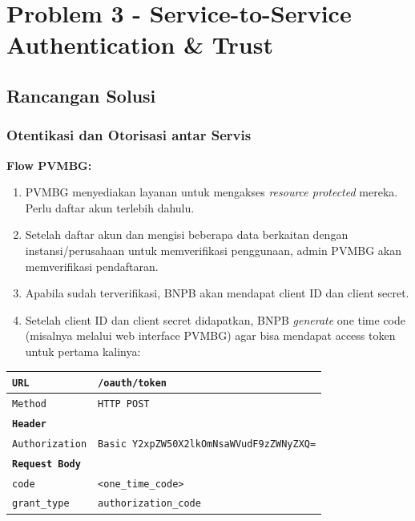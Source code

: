 \chapter{Problem 3 - Service-to-Service Authentication \& Trust}

\section{Rancangan Solusi}

\subsection{Otentikasi dan Otorisasi antar Servis}

\textbf{Flow PVMBG:}

\begin{enumerate}
\def\labelenumi{\arabic{enumi}.}
\tightlist
\item
  PVMBG menyediakan layanan untuk mengakses \emph{resource protected} mereka. Perlu daftar akun terlebih dahulu.\\
\item
  Setelah daftar akun dan mengisi beberapa data berkaitan dengan instansi/perusahaan untuk memverifikasi penggunaan, admin PVMBG akan memverifikasi pendaftaran.\\
\item
  Apabila sudah terverifikasi, BNPB akan mendapat client ID dan client secret.\\
\item
  Setelah client ID dan client secret didapatkan, BNPB \emph{generate} one time code (misalnya melalui web interface PVMBG) agar bisa mendapat access token untuk pertama kalinya:
\end{enumerate}

\begin{longtable}[]{|>{\raggedright\arraybackslash}p{\dimexpr(\linewidth-4\tabcolsep)/2\relax}|>{\raggedright\arraybackslash}p{\dimexpr(\linewidth-4\tabcolsep)/2\relax}|}
\hline
\texttt{URL} & \texttt{/oauth/token} \\
\hline
\endhead
\endlastfoot
\texttt{Method} & \texttt{HTTP\ POST} \\
\hline
\textbf{\texttt{Header}} & \\
\hline
\texttt{Authorization} & \texttt{Basic\ Y2xpZW50X2lkOmNsaWVudF9zZWNyZXQ=} \\
\hline
\textbf{\texttt{Request\ Body}} & \\
\hline
\texttt{code} & \texttt{\textless{}one\_time\_code\textgreater{}} \\
\hline
\texttt{grant\_type} & \texttt{authorization\_code} \\
\hline
\end{longtable}


